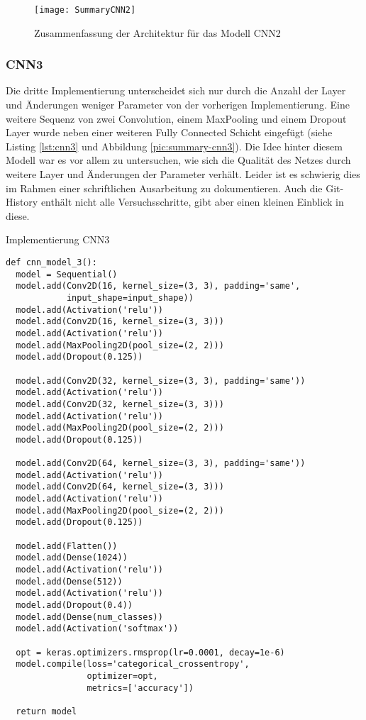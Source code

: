 \begin{figure} [H]
	\centering
	\texttt{[image: SummaryCNN2]}
	\caption{Zusammenfassung der Architektur für das Modell CNN2}
	\label{pic:summary-cnn2}
\end{figure}

\subsubsection{CNN3}
Die dritte Implementierung unterscheidet sich nur durch die Anzahl der Layer und Änderungen weniger Parameter von der vorherigen Implementierung. Eine weitere Sequenz von zwei Convolution, einem MaxPooling und einem Dropout Layer wurde neben einer weiteren Fully Connected Schicht eingefügt (siehe Listing \ref{lst:cnn3} und Abbildung \ref{pic:summary-cnn3}). Die Idee hinter diesem Modell war es vor allem zu untersuchen, wie sich die Qualität des Netzes durch weitere Layer und Änderungen der Parameter verhält. Leider ist es schwierig dies im Rahmen einer schriftlichen Ausarbeitung zu dokumentieren. Auch die Git-History enthält nicht alle Versuchsschritte, gibt aber einen kleinen Einblick in diese. 

\begin{listing} [H] 
	\caption{Implementierung CNN3}
	\label{lst:cnn3}
	\begin{verbatim}
def cnn_model_3():
  model = Sequential()
  model.add(Conv2D(16, kernel_size=(3, 3), padding='same',
            input_shape=input_shape))
  model.add(Activation('relu'))
  model.add(Conv2D(16, kernel_size=(3, 3)))
  model.add(Activation('relu'))
  model.add(MaxPooling2D(pool_size=(2, 2)))
  model.add(Dropout(0.125))

  model.add(Conv2D(32, kernel_size=(3, 3), padding='same'))
  model.add(Activation('relu'))
  model.add(Conv2D(32, kernel_size=(3, 3)))
  model.add(Activation('relu'))
  model.add(MaxPooling2D(pool_size=(2, 2)))
  model.add(Dropout(0.125))

  model.add(Conv2D(64, kernel_size=(3, 3), padding='same'))
  model.add(Activation('relu'))
  model.add(Conv2D(64, kernel_size=(3, 3)))
  model.add(Activation('relu'))
  model.add(MaxPooling2D(pool_size=(2, 2)))
  model.add(Dropout(0.125))

  model.add(Flatten())
  model.add(Dense(1024))
  model.add(Activation('relu'))
  model.add(Dense(512))
  model.add(Activation('relu'))
  model.add(Dropout(0.4))
  model.add(Dense(num_classes))
  model.add(Activation('softmax'))

  opt = keras.optimizers.rmsprop(lr=0.0001, decay=1e-6)
  model.compile(loss='categorical_crossentropy',
                optimizer=opt,
                metrics=['accuracy'])

  return model	
	\end{verbatim}
\end{listing} 

